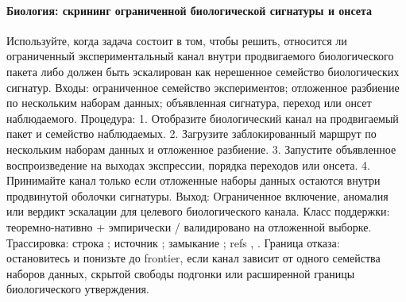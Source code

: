 \paragraph{Биология: скрининг ограниченной биологической сигнатуры и онсета}
Используйте, когда задача состоит в том, чтобы решить, относится ли ограниченный экспериментальный канал внутри продвигаемого биологического пакета либо должен быть эскалирован как нерешенное семейство биологических сигнатур.
Входы: ограниченное семейство экспериментов; \allowbreak отложенное разбиение по нескольким наборам данных; \allowbreak объявленная сигнатура, переход или онсет наблюдаемого.
Процедура: 1. Отобразите биологический канал на продвигаемый пакет и семейство наблюдаемых. 2. Загрузите заблокированный маршрут по нескольким наборам данных и отложенное разбиение. 3. Запустите объявленное воспроизведение на выходах экспрессии, порядка переходов или онсета. 4. Принимайте канал только если отложенные наборы данных остаются внутри продвинутой оболочки сигнатуры.
Выход: Ограниченное включение, аномалия или вердикт эскалации для целевого биологического канала.
Класс поддержки: теоремно-нативно + эмпирически / валидировано на отложенной выборке.
Трассировка: строка ; \allowbreak источник ; \allowbreak замыкание ; \allowbreak refs , \allowbreak {}.
Граница отказа: остановитесь и понизьте до frontier, если канал зависит от одного семейства наборов данных, скрытой свободы подгонки или расширенной границы биологического утверждения.

